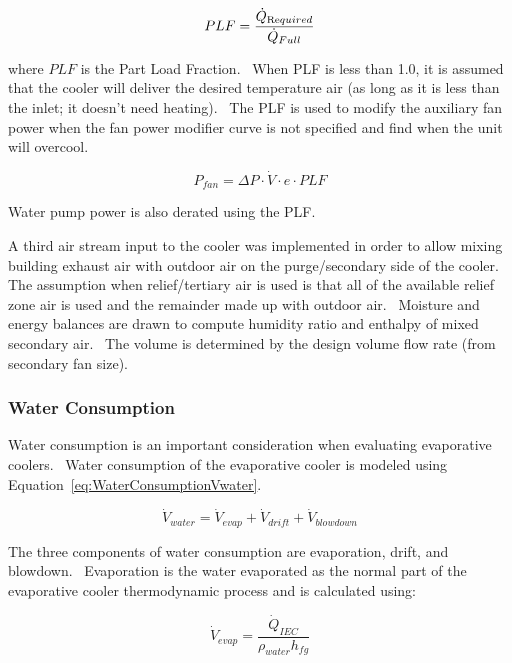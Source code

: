 \begin{equation}
PLF = \frac{{{{\dot Q}_{{\mathop{\rm Re}\nolimits} quired}}}}{{{{\dot Q}_{Full}}}}
\end{equation}

where \(PLF\) is the Part Load Fraction.~ When PLF is less than 1.0, it is assumed that the cooler will deliver the desired temperature air (as long as it is less than the inlet; it doesn't need heating).~ The PLF is used to modify the auxiliary fan power when the fan power modifier curve is not specified and find when the unit will overcool.

\begin{equation}
{P_{fan}} = \Delta P\cdot \dot V\cdot e\cdot PLF
\end{equation}

Water pump power is also derated using the PLF.

A third air stream input to the cooler was implemented in order to allow mixing building exhaust air with outdoor air on the purge/secondary side of the cooler. The assumption when relief/tertiary air is used is that all of the available relief zone air is used and the remainder made up with outdoor air.~ Moisture and energy balances are drawn to compute humidity ratio and enthalpy of mixed secondary air.~ The volume is determined by the design volume flow rate (from secondary fan size).

\subsubsection{Water Consumption}\label{water-consumption}

Water consumption is an important consideration when evaluating evaporative coolers.~ Water consumption of the evaporative cooler is modeled using Equation~\ref{eq:WaterConsumptionVwater}.

\begin{equation}
{\dot V_{water}} = {\dot V_{evap}} + {\dot V_{drift}} + {\dot V_{blowdown}}
\label{eq:WaterConsumptionVwater}
\end{equation}

The three components of water consumption are evaporation, drift, and blowdown.~ Evaporation is the water evaporated as the normal part of the evaporative cooler thermodynamic process and is calculated using:

\begin{equation}
{\dot V_{evap}} = \frac{{{{\dot Q}_{IEC}}}}{{{\rho_{water}}{h_{fg}}}}
\end{equation}


